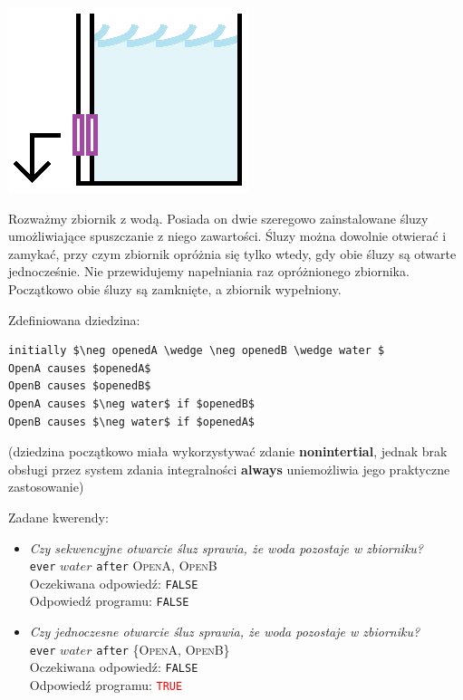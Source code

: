 \documentclass{article}
\begin{document}
\begin{center}
\includegraphics[scale=1]{test6_1}
\end{center}

Rozważmy zbiornik z wodą. Posiada on dwie szeregowo zainstalowane śluzy umożliwiające spuszczanie z niego zawartości. Śluzy można dowolnie otwierać i zamykać, przy czym zbiornik opróżnia się tylko wtedy, gdy obie śluzy są otwarte jednocześnie. Nie przewidujemy napełniania raz opróżnionego zbiornika. Początkowo obie śluzy są zamknięte, a zbiornik wypełniony.

\bigskip
\noindent
Zdefiniowana dziedzina:
\begin{lstlisting}[mathescape=true]
initially $\neg openedA \wedge \neg openedB \wedge water $
OpenA causes $openedA$
OpenB causes $openedB$
OpenA causes $\neg water$ if $openedB$
OpenB causes $\neg water$ if $openedA$
\end{lstlisting}

\noindent
(dziedzina początkowo miała wykorzystywać zdanie \textbf{nonintertial}, jednak brak obsługi przez system zdania integralności \textbf{always} uniemożliwia jego praktyczne zastosowanie)

\bigskip
\noindent
Zadane kwerendy:

\begin{itemize}
    \item \textit{Czy sekwencyjne otwarcie śluz sprawia, że woda pozostaje w zbiorniku?}
    \medskip \\
    {\large\texttt{ever} $water$ \texttt{after} \normalsize \textsc{OpenA, OpenB}}\\
    Oczekiwana odpowiedź: \texttt{FALSE}\\
    Odpowiedź programu: \texttt{FALSE}
    
    \item \textit{Czy jednoczesne otwarcie śluz sprawia, że woda pozostaje w zbiorniku?}
    \medskip \\
    {\large\texttt{ever} $water$ \texttt{after} \normalsize \textsc{\{OpenA, OpenB\}}}\\
    Oczekiwana odpowiedź: \texttt{FALSE}\\
    Odpowiedź programu: \textcolor{red}{\texttt{TRUE}}
\end{itemize}
\end{document}
